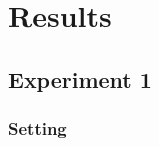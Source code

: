 \documentclass[11pt]{article}
\begin{document}
\section{Results}

\subsection{Experiment 1}

\subsubsection{Setting}
\end{document}
